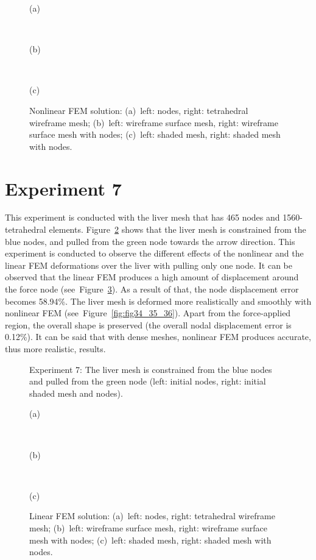 \begin{figure}[h]
\centerline{}
\centerline{(a)}
\centerline{\ }
\centerline{}
\centerline{(b)}
\centerline{\ }
\centerline{}
\centerline{(c)}
\caption{Nonlinear FEM solution: (a)~left: nodes, right: tetrahedral wireframe mesh;
                                 (b)~left: wireframe surface mesh, right: wireframe surface mesh with nodes;
                                 (c)~left: shaded mesh, right: shaded mesh with nodes.}
\label{fig:fig27_28_29}
\end{figure}

\clearpage
\section{Experiment 7}
\label{vii}
This experiment is conducted with the liver mesh that has 465 nodes and 1560-tetrahedral elements. Figure~\ref{fig:fig30} shows that the liver mesh is constrained from the blue nodes, and pulled from the green node towards the arrow direction. This experiment is conducted to observe the different effects of the nonlinear and the linear FEM deformations over the liver with pulling only one node. It can be observed that the linear FEM produces a high amount of displacement around the force node (see~Figure~\ref{fig:fig31_32_33}). As a result of that, the node displacement error becomes 58.94\%. The liver mesh is deformed more realistically and smoothly with nonlinear FEM (see~Figure~\ref{fig:fig34_35_36}). Apart from the force-applied region, the overall shape is preserved (the overall nodal displacement error is 0.12\%). It can be said that with dense meshes, nonlinear FEM produces accurate, thus more realistic, results.

\begin{figure}[h]
\centerline{}
\caption{Experiment 7: The liver mesh is constrained from the blue nodes and pulled from the green node (left: initial nodes, right: initial shaded mesh and nodes).}
\label{fig:fig30}
\end{figure}

\begin{figure}[h]
\centerline{}
\centerline{(a)}
\centerline{\ }
\centerline{}
\centerline{(b)}
\centerline{\ }
\centerline{}
\centerline{(c)}
\caption{Linear FEM solution: (a)~left: nodes, right: tetrahedral wireframe mesh;
                              (b)~left: wireframe surface mesh, right: wireframe surface mesh with nodes;
                              (c)~left: shaded mesh, right: shaded mesh with nodes.}
\label{fig:fig31_32_33}
\end{figure}

